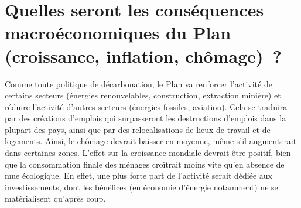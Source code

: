 \documentclass[a5paper,french,openany]{memoir}
\begin{document}
\section*{\normalsize Quelles seront les conséquences macroéconomiques du Plan (croissance, inflation, chômage)~?}\label{q:macro}

Comme toute politique de décarbonation, le Plan va renforcer l'activité de certains secteurs (énergies renouvelables, construction, extraction minière) et réduire l'activité d'autres secteurs (énergies fossiles, aviation). Cela se traduira par des créations d'emplois qui surpasseront les destructions d'emplois dans la plupart des pays, ainsi que par des relocalisations de lieux de travail et de logements. Ainsi, le chômage devrait baisser en moyenne, même s'il augmenterait dans certaines zones. L'effet sur la croissance mondiale devrait être positif, bien que la consommation finale des ménages croîtrait moins vite qu'en absence de mue écologique. En effet, une plus forte part de l'activité serait dédiée aux investissements, dont les bénéfices (en économie d'énergie notamment) ne se matérialisent qu'après coup. 
\end{document}
